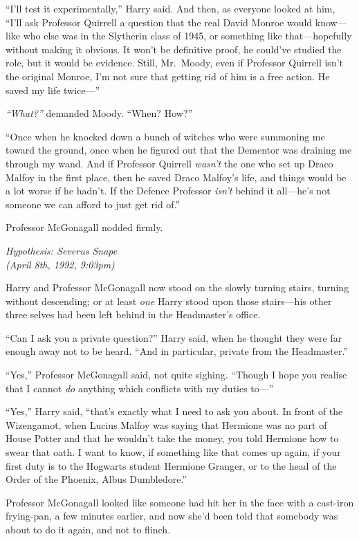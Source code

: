 ``I'll test it experimentally,'' Harry said. And then, as everyone
looked at him, ``I'll ask Professor Quirrell a question that the real
David Monroe would know---like who else was in the Slytherin class of
1945, or something like that---hopefully without making it obvious. It
won't be definitive proof, he could've studied the role, but it would be
evidence. Still, Mr.~Moody, even if Professor Quirrell isn't the
original Monroe, I'm not sure that getting rid of him is a free action.
He saved my life twice---''

\emph{``What?''} demanded Moody. ``When? How?''

``Once when he knocked down a bunch of witches who were summoning me
toward the ground, once when he figured out that the Dementor was
draining me through my wand. And if Professor Quirrell \emph{wasn't} the
one who set up Draco Malfoy in the first place, then he saved Draco
Malfoy's life, and things would be a lot worse if he hadn't. If the
Defence Professor \emph{isn't} behind it all---he's not someone we can
afford to just get rid of.''

Professor McGonagall nodded firmly.

\emph{Hypothesis: Severus Snape}\\\emph{(April 8th, 1992, 9:03pm)}

Harry and Professor McGonagall now stood on the slowly turning stairs,
turning without descending; or at least \emph{one} Harry stood upon
those stairs---his other three selves had been left behind in the
Headmaster's office.

``Can I ask you a private question?'' Harry said, when he thought they
were far enough away not to be heard. ``And in particular, private from
the Headmaster.''

``Yes,'' Professor McGonagall said, not quite sighing. ``Though I hope
you realise that I cannot \emph{do} anything which conflicts with my
duties to---''

``Yes,'' Harry said, ``that's exactly what I need to ask you about. In
front of the Wizengamot, when Lucius Malfoy was saying that Hermione was
no part of House Potter and that he wouldn't take the money, you told
Hermione how to swear that oath. I want to know, if something like that
comes up again, if your first duty is to the Hogwarts student Hermione
Granger, or to the head of the Order of the Phoenix, Albus Dumbledore.''

Professor McGonagall looked like someone had hit her in the face with a
cast-iron frying-pan, a few minutes earlier, and now she'd been told
that somebody was about to do it again, and not to flinch.

